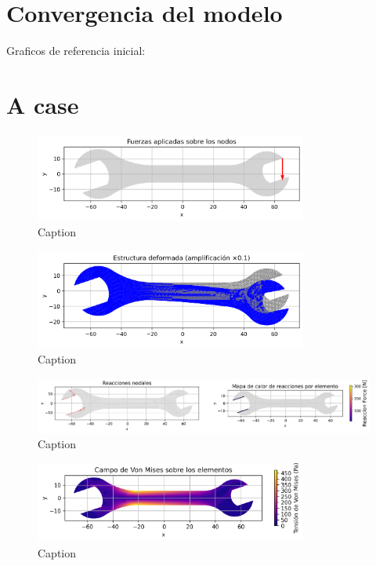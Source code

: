\section{Convergencia del modelo}

Graficos de referencia inicial:

\section{A case}

\begin{figure}[H]
  \centering
  \includegraphics[width=0.8\textwidth]{GRAFICOS/Case a_fuerzas.png}
  \caption{Caption}
  \label{fig:strain}
\end{figure}

\begin{figure}[H]
  \centering
  \includegraphics[width=0.8\textwidth]{GRAFICOS/Case a_deformada.png}
  \caption{Caption}
  \label{fig:stress}
\end{figure}

\begin{figure}[H]
  \centering
  \includegraphics[width=1\textwidth]{GRAFICOS/Case a_deformada_reacciones.png}
  \caption{Caption}
  \label{fig:principal}
\end{figure}

\begin{figure}[H]
  \centering
  \includegraphics[width=0.8\textwidth]{GRAFICOS/Case a_von_mises.png}
  \caption{Caption}
  \label{fig:principal}
\end{figure}

